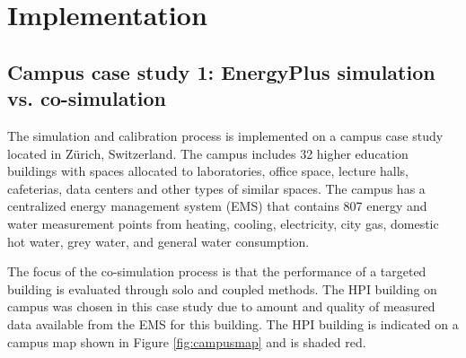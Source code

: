 \documentclass{tBPS2e}
\theoremstyle{plain}
\theoremstyle{definition}
\theoremstyle{remark}
\begin{document}
\section{Implementation}\label{Implementation}
\subsection{Campus case study 1: EnergyPlus simulation vs. co-simulation}
The simulation and calibration process is implemented on a campus case study located in Z\"urich, Switzerland. The campus includes 32 higher education buildings with spaces allocated to laboratories, office space, lecture halls, cafeterias, data centers and other types of similar spaces. The campus has a centralized energy management system (EMS) that contains 807 energy and water measurement points from heating, cooling, electricity, city gas, domestic hot water, grey water, and general water consumption. 



The focus of the co-simulation process is that the performance of a targeted building is evaluated through solo and coupled methods. The HPI building on campus was chosen in this case study due to amount and quality of measured data available from the EMS for this building. The HPI building is indicated on a campus map shown in Figure \ref{fig:campusmap} and is shaded red.

\end{document}

